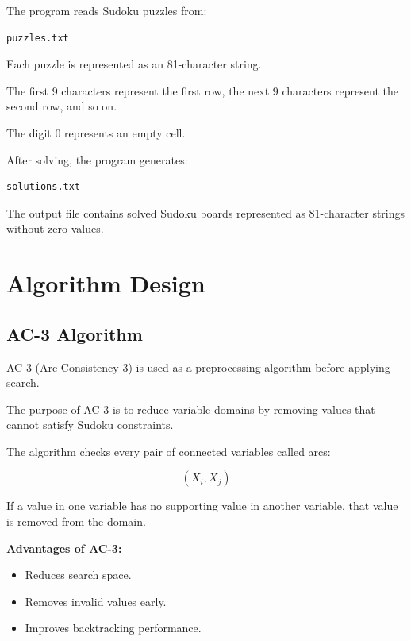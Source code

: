 \documentclass[12pt,a4paper]{article}
\begin{document}
The program reads Sudoku puzzles from:

\begin{verbatim}
puzzles.txt
\end{verbatim}


Each puzzle is represented as an 81-character string.

The first 9 characters represent the first row, the next 9 characters
represent the second row, and so on.


The digit 0 represents an empty cell.


After solving, the program generates:

\begin{verbatim}
solutions.txt
\end{verbatim}


The output file contains solved Sudoku boards represented as 81-character
strings without zero values.




\section{Algorithm Design}


\subsection{AC-3 Algorithm}


AC-3 (Arc Consistency-3) is used as a preprocessing algorithm before applying
search.

The purpose of AC-3 is to reduce variable domains by removing values that
cannot satisfy Sudoku constraints.


The algorithm checks every pair of connected variables called arcs:

\[
(X_i,X_j)
\]


If a value in one variable has no supporting value in another variable,
that value is removed from the domain.


\textbf{Advantages of AC-3:}

\begin{itemize}

\item Reduces search space.

\item Removes invalid values early.

\item Improves backtracking performance.

\end{itemize}
\end{document}
